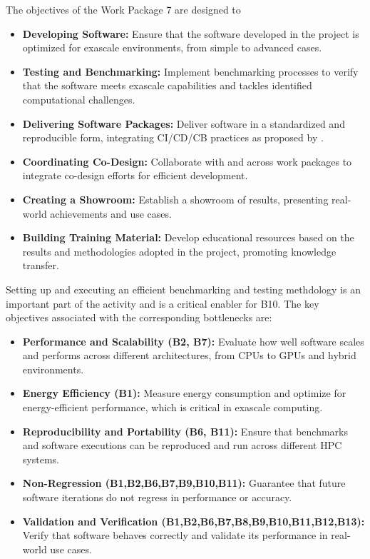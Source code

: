 The objectives of the Work Package 7 are designed to 
\begin{itemize}
    \item \textbf{Developing Software:} Ensure that the software developed in the \exama project is optimized for exascale environments, from simple to advanced cases.
    \item \textbf{Testing and Benchmarking:} Implement benchmarking processes to verify that the software meets exascale capabilities and tackles identified computational challenges.
    \item \textbf{Delivering Software Packages:} Deliver software in a standardized and reproducible form, integrating CI/CD/CB practices as proposed by \exadi.
    \item \textbf{Coordinating Co-Design:} Collaborate with \exadi and across \exama work packages to integrate co-design efforts for efficient development.
    \item \textbf{Creating a Showroom:} Establish a showroom of \exama results, presenting real-world achievements and use cases.
    \item \textbf{Building Training Material:} Develop educational resources based on the results and methodologies adopted in the \exama project, promoting knowledge transfer.
\end{itemize}
Setting up and executing an efficient benchmarking and testing methdology is an important part of the activity and is a critical enabler for \ac{B10}.
The key objectives associated with the corresponding bottlenecks are:
\begin{itemize}
    \item \textbf{Performance and Scalability (\ac{B2},  \ac{B7}):} Evaluate how well software scales and performs across different architectures, from CPUs to GPUs and hybrid environments.
    \item \textbf{Energy Efficiency (\ac{B1}):} Measure energy consumption and optimize for energy-efficient performance, which is critical in exascale computing.
    \item \textbf{Reproducibility and Portability (\ac{B6}, \ac{B11}):} Ensure that benchmarks and software executions can be reproduced and run across different HPC systems.
    \item \textbf{Non-Regression (\ac{B1},\ac{B2},\ac{B6},\ac{B7},\ac{B9},\ac{B10},\ac{B11}):} Guarantee that future software iterations do not regress in performance or accuracy.
    \item \textbf{Validation and Verification (\ac{B1},\ac{B2},\ac{B6},\ac{B7},\ac{B8},\ac{B9},\ac{B10},\ac{B11},\ac{B12},\ac{B13}):} Verify that software behaves correctly and validate its performance in real-world use cases.
\end{itemize}



